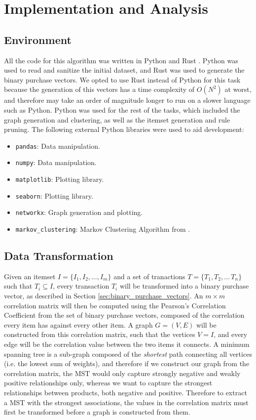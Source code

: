 \chapter{Implementation and Analysis}

\section{Environment}
All the code for this algorithm was written in Python  and Rust . Python was used to read and sanitize the initial dataset, and Rust was used to generate the binary purchase vectors. We opted to use Rust instead of Python for this task because the generation of this vectors has a time complexity of $O(N^2)$ at worst, and therefore may take an order of magnitude longer to run on a slower language such as Python. Python was used for the rest of the tasks, which included the graph generation and clustering, as well as the itemset generation and rule pruning. The following external Python libraries were used to aid development:
\begin{itemize}
\item \texttt{pandas}: Data manipulation.
\item \texttt{numpy}: Data manipulation.
\item \texttt{matplotlib}: Plotting library.
\item \texttt{seaborn}: Plotting library.
\item \texttt{networkx}: Graph generation and plotting.
\item \texttt{markov\_clustering}: Markov Clustering Algorithm from .
\end{itemize}

\section{Data Transformation}
\label{sec:algo_data}
Given an itemset $I = \{I_1, I_2,\dots,I_m\}$ and a set of tranactions $T = \{T_1,T_2,\dots\,T_n\}$ such that $T_i \subseteq I$, every transaction $T_i$ will be transformed into a binary purchase vector, as described in Section \ref{sec:binary_purchase_vectors}. An $m \times m$ correlation matrix will then be computed using the Pearson's Correlation Coefficient from the set of binary purchase vectors, composed of the correlation every item has against every other item. A graph $G = (V,E)$ will be constructed from this correlation matrix, such that the vertices $V=I$, and every edge will be the correlation value between the two items it connects. A minimum spanning tree is a sub-graph composed of the \textit{shortest} path connecting all vertices (i.e. the lowest sum of weights), and therefore if we construct our graph from the correlation matrix, the MST would only capture strongly negative and weakly positive relationships only, whereas we want to capture the strongest relationships between products, both negative and positive. Therefore to extract a MST with the strongest associations, the values in the correlation matrix must first be transformed before a graph is constructed from them.

